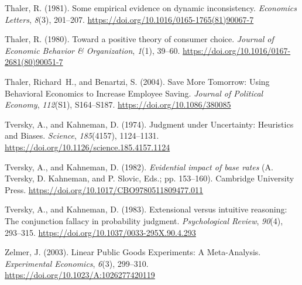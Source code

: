 \documentclass[
  letterpaper,
  DIV=11,
  numbers=noendperiod]{scrreprt}
\newlength{\cslhangindent}
\newlength{\cslentryspacingunit} %
\newenvironment{CSLReferences}[2] %
 {%
  \setlength{\parindent}{0pt}
  \ifodd #1
  \let\oldpar\par
  \def\par{\hangindent=\cslhangindent\oldpar}
  \fi
  \setlength{\parskip}{#2\cslentryspacingunit}
 }%
 {}
\begin{document}
\begin{CSLReferences}{1}{0}
\leavevmode{}%
Thaler, R. (1981). Some empirical evidence on dynamic inconsistency.
\emph{Economics Letters}, \emph{8}(3), 201--207.
\url{https://doi.org/10.1016/0165-1765(81)90067-7}

\leavevmode{}%
Thaler, R. (1980). Toward a positive theory of consumer choice.
\emph{Journal of Economic Behavior \& Organization}, \emph{1}(1),
39--60. \url{https://doi.org/10.1016/0167-2681(80)90051-7}

\leavevmode{}%
Thaler, Richard~H., and Benartzi, S. (2004). Save More
Tomorrow{\texttrademark}: Using Behavioral Economics to Increase
Employee Saving. \emph{Journal of Political Economy}, \emph{112}(S1),
S164--S187. \url{https://doi.org/10.1086/380085}

\leavevmode{}%
Tversky, A., and Kahneman, D. (1974). Judgment under Uncertainty:
Heuristics and Biases. \emph{Science}, \emph{185}(4157), 1124--1131.
\url{https://doi.org/10.1126/science.185.4157.1124}

\leavevmode{}%
Tversky, A., and Kahneman, D. (1982). \emph{Evidential impact of base
rates} (A. Tversky, D. Kahneman, and P. Slovic, Eds.; pp. 153--160).
Cambridge University Press.
\url{https://doi.org/10.1017/CBO9780511809477.011}

\leavevmode{}%
Tversky, A., and Kahneman, D. (1983). Extensional versus intuitive
reasoning: The conjunction fallacy in probability judgment.
\emph{Psychological Review}, \emph{90}(4), 293--315.
\url{https://doi.org/10.1037/0033-295X.90.4.293}

\leavevmode{}%
Zelmer, J. (2003). Linear Public Goods Experiments: A Meta-Analysis.
\emph{Experimental Economics}, \emph{6}(3), 299--310.
\url{https://doi.org/10.1023/A:1026277420119}

\end{CSLReferences}
\end{document}
